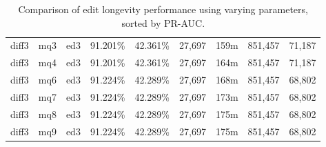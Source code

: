 \begin{sidewaystable}[!tp]
\begin{center}
\begin{tabular}{|c|c|c||c|c||c|c|c|c|}
diff3 & mq3 & ed3 & 91.201\% & 42.361\% & 27,697 & 159m & 851,457 & 71,187 \\
diff3 & mq4 & ed3 & 91.201\% & 42.361\% & 27,697 & 164m & 851,457 & 71,187 \\
diff3 & mq6 & ed3 & 91.224\% & 42.289\% & 27,697 & 168m & 851,457 & 68,802 \\
diff3 & mq7 & ed3 & 91.224\% & 42.289\% & 27,697 & 173m & 851,457 & 68,802 \\
diff3 & mq8 & ed3 & 91.224\% & 42.289\% & 27,697 & 175m & 851,457 & 68,802 \\
diff3 & mq9 & ed3 & 91.224\% & 42.289\% & 27,697 & 175m & 851,457 & 68,802 \\
\hline
\end{tabular}
\end{center}
\caption{Comparison of edit longevity performance using
    varying parameters, sorted by PR-AUC.}
\label{tab:editshout}
\end{sidewaystable}
